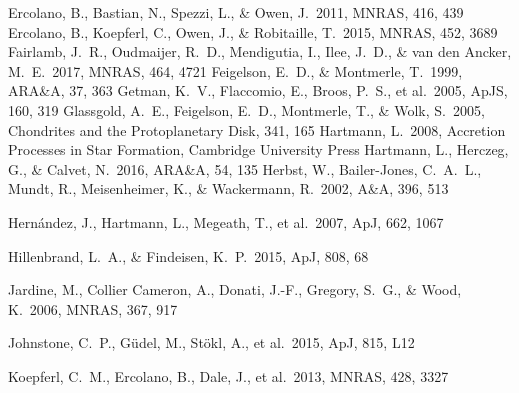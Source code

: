 \documentclass[10pt,fleqn,twoside,a4paper]{article}
\newcommand*\aap{A\&A}
\newcommand*\apj{ApJ}
\newcommand*\apjl{ApJ}
\newcommand*\apjs{ApJS}
\newcommand*\araa{ARA\&A}
\newcommand*\mnras{MNRAS}
\begin{document}
\begin{thebibliography}{}
 Ercolano, B., Bastian, N., Spezzi, L., \& Owen, J.\ 2011, \mnras, 416, 439
 Ercolano, B., Koepferl, C., Owen, J., \& Robitaille, T.\ 2015, \mnras, 452, 3689 
 Fairlamb, J.~R., Oudmaijer, R.~D., Mendigutia, I., Ilee, J.~D., \& van den Ancker, M.~E.\ 2017, \mnras, 464, 4721
 Feigelson, E.~D., \& Montmerle, T.\ 1999, \araa, 37, 363 
 Getman, K.~V., Flaccomio, E., Broos, P.~S., et al.\ 2005, \apjs, 160, 319 
 Glassgold, A.~E., Feigelson, E.~D., Montmerle, T., \& Wolk, S.\ 2005, Chondrites and the Protoplanetary Disk, 341, 165
 Hartmann, L.\ 2008, Accretion Processes in Star Formation,  Cambridge University Press
 Hartmann, L., Herczeg, G., \& Calvet, N.\ 2016, \araa, 54, 135 
 Herbst, W., Bailer-Jones, C.~A.~L., Mundt, R., Meisenheimer, K., \& Wackermann, R.\ 2002, \aap, 396, 513 

 Hern{\'a}ndez, J., Hartmann, L., Megeath, T., et al.\ 2007, \apj, 662, 1067 

 Hillenbrand, L.~A., \& Findeisen, K.~P.\ 2015, \apj, 808, 68 

 Jardine, M., Collier Cameron, A., Donati, J.-F., Gregory, S.~G., \& Wood, K.\ 2006, \mnras, 367, 917

 Johnstone, C.~P., G{\"u}del, M., St{\"o}kl, A., et al.\ 2015, \apjl, 815, L12

 Koepferl, C.~M., Ercolano, B., Dale, J., et al.\ 2013, \mnras, 428, 3327


\end{thebibliography}
\end{document}

